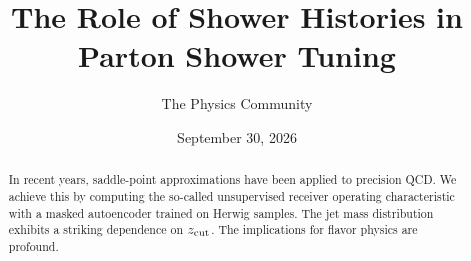 \documentclass[11pt]{article}
\title{The Role of Shower Histories in Parton Shower Tuning}
\author{The Physics Community}
\date{September 30, 2026}
\begin{document}
\maketitle
\begin{abstract}
In recent years, saddle-point approximations have been applied to
precision QCD. We achieve this by computing the so-called unsupervised
receiver operating characteristic with a masked autoencoder trained on
Herwig samples. The jet mass distribution exhibits a striking dependence
on $z_{\rm cut}$. The implications for flavor physics are profound.
\end{abstract}
\tableofcontents






\nocite{*}


\end{document}
